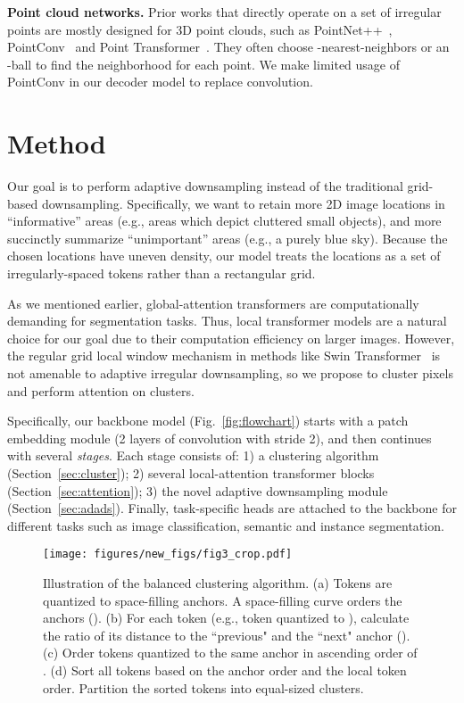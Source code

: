 \documentclass[10pt,twocolumn,letterpaper]{article}
\begin{document}
\noindent\textbf{Point cloud networks.} Prior works that directly operate on a set of irregular points are mostly designed for 3D point clouds, such as PointNet++~\cite{pointnet++}, PointConv~\cite{pointconv} and Point Transformer~\cite{pointtransformer}. They often choose -nearest-neighbors or an -ball to find the neighborhood for each point. We make limited usage of PointConv in our decoder model to replace  convolution. %
 













\section{Method}\label{sec:method}
Our goal is to perform adaptive downsampling instead of the traditional grid-based downsampling. Specifically, we want to retain more 2D image locations in  ``informative'' areas (e.g., areas which depict cluttered small objects), and more succinctly summarize ``unimportant'' areas (e.g., a purely blue sky). Because the chosen locations  have uneven density, our model treats the locations as a set of irregularly-spaced tokens rather than a rectangular grid. 


As we mentioned earlier, global-attention transformers are computationally demanding for segmentation tasks. Thus, local transformer models are a natural choice for our goal due to their computation efficiency on larger images.  However, the regular grid local window mechanism in methods like Swin Transformer~\cite{swin} is not amenable to adaptive irregular downsampling, so we propose to cluster pixels and perform attention on clusters.


Specifically, our backbone model (Fig.~\ref{fig:flowchart}) starts with a patch embedding module (2 layers of  convolution with stride 2), and then continues with several \textit{stages}. Each stage consists of: 1) a clustering algorithm (Section~\ref{sec:cluster}); 2) several local-attention transformer blocks (Section~\ref{sec:attention}); 3) the novel adaptive downsampling module (Section~\ref{sec:adads}).  Finally, task-specific heads are attached to the backbone for different tasks such as image classification, semantic and instance segmentation.



\begin{figure}
\texttt{[image: figures/new\_figs/fig3\_crop.pdf]} 
\vskip -0.05in
\caption{Illustration of the balanced clustering algorithm. (a) Tokens are quantized to space-filling anchors. A space-filling curve orders the anchors (). (b) For each token (e.g., token  quantized to ), calculate the ratio of its distance to the ``previous" and the ``next" anchor (). (c) Order tokens quantized to the same anchor in ascending order of . (d) Sort all tokens based on the anchor order and the local token order. Partition the sorted tokens into equal-sized clusters.}
\label{fig:cluster}
\vskip -0.2in
\end{figure}
\end{document}
